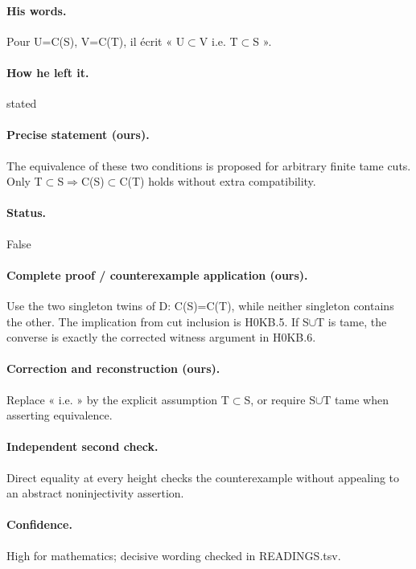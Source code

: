 \paragraph{His words.} Pour U=C(S), V=C(T), il écrit « U\ensuremath{\subset}V i.e. T\ensuremath{\subset}S ».

\paragraph{How he left it.} stated

\paragraph{Precise statement (ours).} The equivalence of these two conditions is proposed for arbitrary finite tame cuts. Only T\ensuremath{\subset}S\ensuremath{\Rightarrow}C(S)\ensuremath{\subset}C(T) holds without extra compatibility.

\paragraph{Status.} False

\paragraph{Complete proof / counterexample application (ours).} Use the two singleton twins of D: C(S)=C(T), while neither singleton contains the other. The implication from cut inclusion is H0KB.5. If S\ensuremath{\cup}T is tame, the converse is exactly the corrected witness argument in H0KB.6.

\paragraph{Correction and reconstruction (ours).} Replace « i.e. » by the explicit assumption T\ensuremath{\subset}S, or require S\ensuremath{\cup}T tame when asserting equivalence.

\paragraph{Independent second check.} Direct equality at every height checks the counterexample without appealing to an abstract noninjectivity assertion.

\paragraph{Confidence.} High for mathematics; decisive wording checked in READINGS.tsv.

